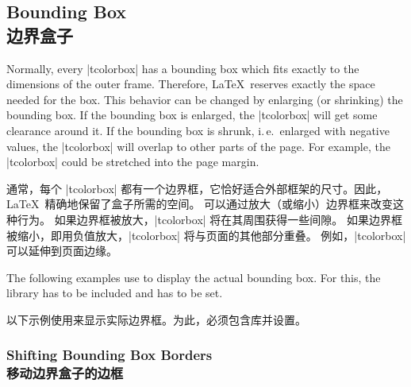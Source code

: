 \setcounter{section}{4}
\setcounter{subsection}{14}
\setcounter{subsubsection}{0}

\subsection{Bounding Box\\边界盒子}

Normally, every |tcolorbox| has a bounding box which fits exactly to the
dimensions of the outer frame. Therefore, \LaTeX\ reserves exactly the space
needed for the box.
This behavior can be changed by enlarging (or shrinking) the bounding box.
If the bounding box is enlarged, the |tcolorbox| will get some clearance
around it. If the bounding box is shrunk, i.\,e.\ enlarged with negative
values, the |tcolorbox| will overlap to other parts of the page.
For example, the |tcolorbox| could be stretched into the page margin.

通常，每个 |tcolorbox| 都有一个边界框，它恰好适合外部框架的尺寸。因此，\LaTeX\ 精确地保留了盒子所需的空间。 可以通过放大（或缩小）边界框来改变这种行为。 如果边界框被放大，|tcolorbox| 将在其周围获得一些间隙。 如果边界框被缩小，即用负值放大，|tcolorbox| 将与页面的其他部分重叠。 例如，|tcolorbox| 可以延伸到页面边缘。


\begin{marker}
The following examples use  to display the actual bounding box. For this, the library  has to be included and  has to be set.

以下示例使用来显示实际边界框。为此，必须包含库并设置。
\end{marker}



\subsubsection{Shifting Bounding Box Borders\\移动边界盒子的边框}

